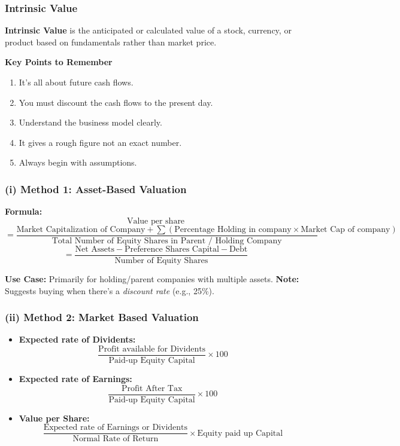 \documentclass[12pt]{article}
\begin{document}
\subsubsection*{Intrinsic Value}
\textbf{Intrinsic Value} is the anticipated or calculated value of a stock, currency, or product based on fundamentals rather than market price.

\textbf{Key Points to Remember}
\begin{enumerate}[label=\arabic*.]
    \item It's all about future cash flows.
    \item You must discount the cash flows to the present day.
    \item Understand the business model clearly.
    \item It gives a rough figure not an exact number.
    \item Always begin with assumptions.
\end{enumerate}

\subsubsection*{(i) Method 1: Asset-Based Valuation}
\textbf{Formula:}
\[
\text{Value per share}
\]
\[
= \frac{\text{Market Capitalization of Company} + \sum \left( \text{Percentage Holding in company} \times \text{Market Cap of company} \right)}{\text{Total Number of Equity Shares in Parent / Holding Company}}
\]
\[
= \frac{\text{Net Assets} - \text{Preference Shares Capital} - \text{Debt}}{\text{Number of Equity Shares}}
\]

\textbf{Use Case:} Primarily for holding/parent companies with multiple assets.  
\textbf{Note:} Suggests buying when there's a \textit{discount rate} (e.g., 25\%).

\subsubsection*{(ii) Method 2: Market Based Valuation}
\begin{itemize}
    \item \textbf{Expected rate of Dividents:}
    \[
    \frac{\text{Profit available for Dividents}}{\text{Paid-up Equity Capital}} \times 100
    \]
    \item \textbf{Expected rate of Earnings:}
    \[
    \frac{\text{Profit After Tax}}{\text{Paid-up Equity Capital}} \times 100
    \]
    \item \textbf{Value per Share:}
    \[
    \frac{\text{Expected rate of Earnings or Dividents}}{\text{Normal Rate of Return}} \times {\text{Equity paid up Capital}}
    \]
\end{itemize}
\end{document}
